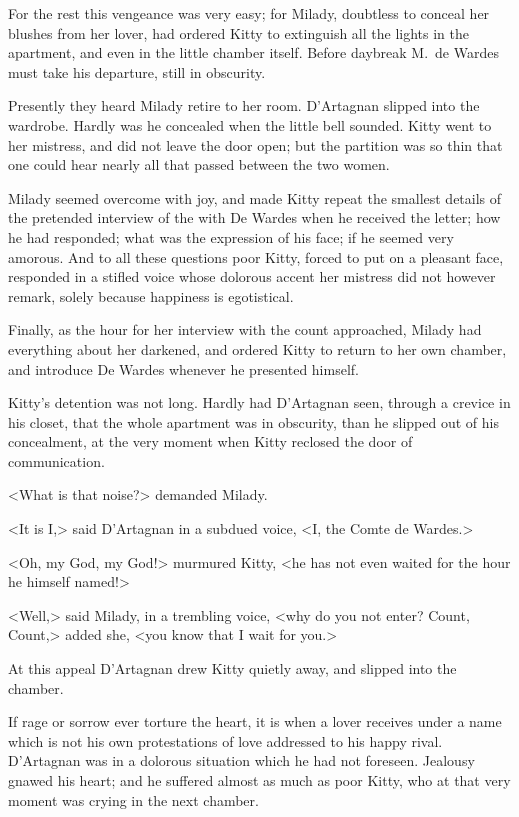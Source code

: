 For the rest this vengeance was very easy; for Milady, doubtless to conceal her blushes from her lover, had ordered Kitty to extinguish all the lights in the apartment, and even in the little chamber itself. Before daybreak M.~de Wardes must take his departure, still in obscurity. 

Presently they heard Milady retire to her room. D'Artagnan slipped into the wardrobe. Hardly was he concealed when the little bell sounded. Kitty went to her mistress, and did not leave the door open; but the partition was so thin that one could hear nearly all that passed between the two women. 

Milady seemed overcome with joy, and made Kitty repeat the smallest details of the pretended interview of the  with De Wardes when he received the letter; how he had responded; what was the expression of his face; if he seemed very amorous. And to all these questions poor Kitty, forced to put on a pleasant face, responded in a stifled voice whose dolorous accent her mistress did not however remark, solely because happiness is egotistical. 

Finally, as the hour for her interview with the count approached, Milady had everything about her darkened, and ordered Kitty to return to her own chamber, and introduce De Wardes whenever he presented himself. 

Kitty's detention was not long. Hardly had D'Artagnan seen, through a crevice in his closet, that the whole apartment was in obscurity, than he slipped out of his concealment, at the very moment when Kitty reclosed the door of communication. 

<What is that noise?> demanded Milady. 

<It is I,> said D'Artagnan in a subdued voice, <I, the Comte de Wardes.> 

<Oh, my God, my God!> murmured Kitty, <he has not even waited for the hour he himself named!> 

<Well,> said Milady, in a trembling voice, <why do you not enter? Count, Count,> added she, <you know that I wait for you.> 

At this appeal D'Artagnan drew Kitty quietly away, and slipped into the chamber. 

If rage or sorrow ever torture the heart, it is when a lover receives under a name which is not his own protestations of love addressed to his happy rival. D'Artagnan was in a dolorous situation which he had not foreseen. Jealousy gnawed his heart; and he suffered almost as much as poor Kitty, who at that very moment was crying in the next chamber. 

